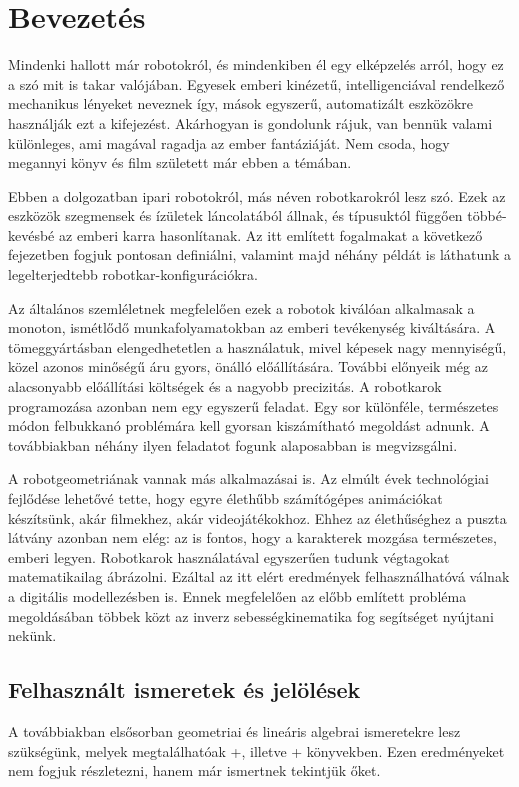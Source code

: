 \documentclass[12pt,a4paper]{report}
\theoremstyle{remark}
\theoremstyle{definition}
\begin{document}
\tableofcontents

\chapter{Bevezetés}
Mindenki hallott már robotokról, és mindenkiben él egy elképzelés arról, hogy ez a szó mit is takar valójában. 
Egyesek emberi kinézetű, intelligenciával rendelkező mechanikus lényeket neveznek így, mások egyszerű, automatizált 
eszközökre használják ezt a kifejezést. Akárhogyan is gondolunk rájuk, van bennük valami különleges, ami magával 
ragadja az ember fantáziáját. Nem csoda, hogy megannyi könyv és film született már ebben a témában.

Ebben a dolgozatban ipari robotokról, más néven robotkarokról lesz szó. Ezek az eszközök szegmensek és ízületek 
láncolatából állnak, és típusuktól függően többé-kevésbé az emberi karra hasonlítanak. Az itt említett fogalmakat a 
következő fejezetben fogjuk pontosan definiálni, valamint majd néhány példát is láthatunk a legelterjedtebb 
robotkar-konfigurációkra.

Az általános szemléletnek megfelelően ezek a robotok kiválóan alkalmasak a monoton, ismétlődő munkafolyamatokban 
az emberi tevékenység kiváltására. A tömeggyártásban elengedhetetlen a használatuk, mivel képesek nagy mennyiségű, 
közel azonos minőségű áru gyors, önálló előállítására. További előnyeik még az alacsonyabb előállítási költségek és 
a nagyobb precizitás. A robotkarok programozása azonban nem egy egyszerű feladat. Egy sor különféle, természetes 
módon felbukkanó problémára kell gyorsan kiszámítható megoldást adnunk. A továbbiakban néhány ilyen feladatot fogunk 
alaposabban is megvizsgálni.

A robotgeometriának vannak más alkalmazásai is. Az elmúlt évek technológiai fejlődése lehetővé tette, hogy egyre
élethűbb számítógépes animációkat készítsünk, akár filmekhez, akár videojátékokhoz. Ehhez az élethűséghez a puszta
látvány azonban nem elég: az is fontos, hogy a karakterek mozgása természetes, emberi legyen. Robotkarok 
használatával egyszerűen tudunk végtagokat matematikailag ábrázolni. Ezáltal az itt elért eredmények 
felhasználhatóvá válnak a digitális modellezésben is. Ennek megfelelően az előbb említett probléma megoldásában  
többek közt az inverz sebességkinematika fog segítséget nyújtani nekünk.

\section{Felhasznált ismeretek és jelölések}
A továbbiakban elsősorban geometriai és lineáris algebrai ismeretekre lesz szükségünk, melyek megtalálhatóak 
\az+\textcite{hajos_geo}, illetve \az+\textcite{freud_linalg} könyvekben. Ezen eredményeket nem fogjuk részletezni, 
hanem már ismertnek tekintjük őket.
\end{document}
